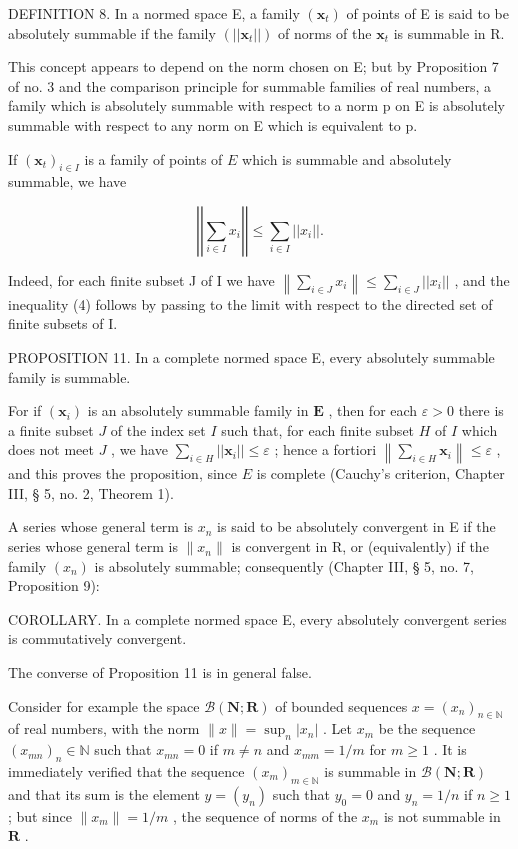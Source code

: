 DEFINITION 8. In a normed space E, a family \((\pmb{x}_{t})\) of points of E is said to be absolutely summable if the family \((||\pmb{x}_{t}||)\) of norms of the \(\pmb{x}_{t}\) is summable in R.

This concept appears to depend on the norm chosen on E; but by Proposition 7 of no. 3 and the comparison principle for summable families of real numbers, a family which is absolutely summable with respect to a norm p on E is absolutely summable with respect to any norm on E which is equivalent to p.

If \((\pmb{x}_t)_{i\in I}\) is a family of points of \(E\) which is summable and absolutely summable, we have

\[
\left| \left| \sum_ {i \in I} x _ {i} \right| \right| \leqslant \sum_ {i \in I} | | x _ {i} | |.\tag{4}
\]

Indeed, for each finite subset J of I we have \(\left\|\sum_{i\in J}x_{i}\right\| \leqslant \sum_{i\in J}||x_{i}||\) , and the inequality (4) follows by passing to the limit with respect to the directed set of finite subsets of I.

PROPOSITION 11. In a complete normed space E, every absolutely summable family is summable.

For if \((\pmb{x}_i)\) is an absolutely summable family in \(\mathbf{E}\) , then for each \(\varepsilon > 0\) there is a finite subset \(J\) of the index set \(I\) such that, for each finite subset \(H\) of \(I\) which does not meet \(J\) , we have \(\sum_{i \in H} ||\pmb{x}_i|| \leqslant \varepsilon\) ; hence a fortiori \(\left\| \sum_{i \in H} \pmb{x}_i \right\| \leqslant \varepsilon\) , and this proves the proposition, since \(E\) is complete (Cauchy's criterion, Chapter III, § 5, no. 2, Theorem 1).

A series whose general term is \(x_{n}\) is said to be absolutely convergent in E if the series whose general term is \(\|x_{n}\|\) is convergent in R, or (equivalently) if the family \((x_{n})\) is absolutely summable; consequently (Chapter III, § 5, no. 7, Proposition 9):

COROLLARY. In a complete normed space E, every absolutely convergent series is commutatively convergent.

The converse of Proposition 11 is in general false.

Consider for example the space \(\mathcal{B}(\mathbf{N};\mathbf{R})\) of bounded sequences \(x = (x_{n})_{n\in \mathbb{N}}\) of real numbers, with the norm \(\| x\| = \sup_n |x_n|\) . Let \(x_{m}\) be the sequence \((x_{mn})_n\in \mathbb{N}\) such that \(x_{mn} = 0\) if \(m\neq n\) and \(x_{mm} = 1 / m\) for \(m\geqslant 1\) . It is immediately verified that the sequence \((x_m)_{m\in \mathbb{N}}\) is summable in \(\mathcal{B}(\mathbf{N};\mathbf{R})\) and that its sum is the element \(y = (y_{n})\) such that \(y_0 = 0\) and \(y_{n} = 1 / n\) if \(n\geqslant 1\) ; but since \(\| x_m\| = 1 / m\) , the sequence of norms of the \(x_{m}\) is not summable in \(\mathbf{R}\) .

